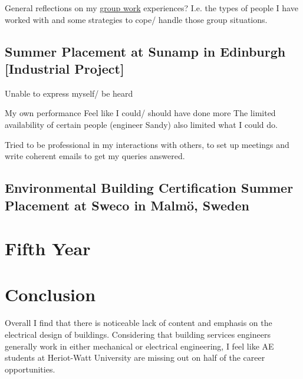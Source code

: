 General reflections on my \underline{group work} experiences?
I.e. the types of people I have worked with and some strategies to cope/ handle those group situations.





\subsection{Summer Placement at Sunamp in Edinburgh [Industrial Project]}

Unable to express myself/ be heard

My own performance
Feel like I could/ should have done more
The limited availability of certain people (engineer Sandy) also limited what I could do.

Tried to be professional in my interactions with others, to set up meetings and write coherent emails to get my queries answered.




\subsection{Environmental Building Certification Summer Placement at Sweco in Malmö, Sweden}




\section{Fifth Year}




\section{Conclusion}

Overall I find that there is noticeable lack of content and emphasis on the electrical design of buildings.
Considering that building services engineers generally work in either mechanical or electrical engineering, I feel like AE students at Heriot-Watt University are missing out on half of the career opportunities.